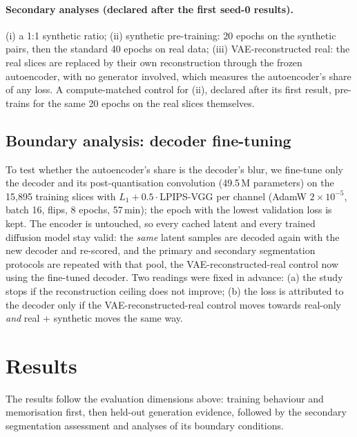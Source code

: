 \documentclass[10pt,a4paper]{article}
\begin{document}
\paragraph{Secondary analyses (declared after the first seed-0 results).} (i) a 1:1 synthetic ratio; (ii) synthetic pre-training: 20 epochs on the synthetic pairs, then the standard 40 epochs on real data; (iii) VAE-reconstructed real: the real slices are replaced by their own reconstruction through the frozen autoencoder, with no generator involved, which measures the autoencoder's share of any loss. A compute-matched control for (ii), declared after its first result, pre-trains for the same 20 epochs on the real slices themselves.

\subsection{Boundary analysis: decoder fine-tuning}
\label{sec:method-dec}
To test whether the autoencoder's share is the decoder's blur, we fine-tune only the decoder and its post-quantisation convolution (49.5\,M parameters) on the 15,895 training slices with $L_1 + 0.5\cdot$LPIPS-VGG per channel (AdamW $2\times10^{-5}$, batch 16, flips, 8 epochs, 57\,min); the epoch with the lowest validation loss is kept. The encoder is untouched, so every cached latent and every trained diffusion model stay valid: the \emph{same} latent samples are decoded again with the new decoder and re-scored, and the primary and secondary segmentation protocols are repeated with that pool, the VAE-reconstructed-real control now using the fine-tuned decoder. Two readings were fixed in advance: (a) the study stops if the reconstruction ceiling does not improve; (b) the loss is attributed to the decoder only if the VAE-reconstructed-real control moves towards real-only \emph{and} real + synthetic moves the same way.

\section{Results}
The results follow the evaluation dimensions above: training behaviour and memorisation first, then held-out generation evidence, followed by the secondary segmentation assessment and analyses of its boundary conditions.
\end{document}
